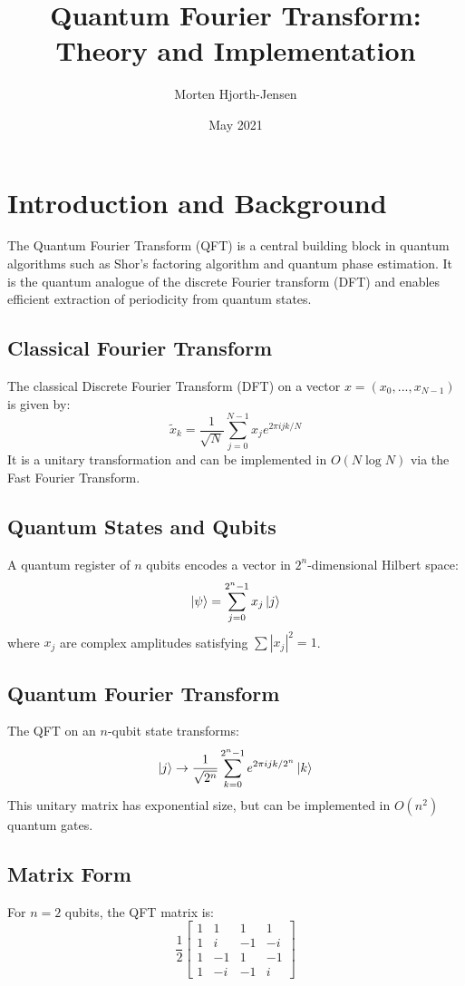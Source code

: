 \documentclass[12pt]{book}
\title{Quantum Fourier Transform: Theory and Implementation}
\author{Morten Hjorth-Jensen}
\date{May 2021}
\begin{document}
\maketitle
\tableofcontents

\chapter{Introduction and Background}
The Quantum Fourier Transform (QFT) is a central building block in quantum algorithms such as Shor's factoring algorithm and quantum phase estimation. It is the quantum analogue of the discrete Fourier transform (DFT) and enables efficient extraction of periodicity from quantum states.

\section{Classical Fourier Transform}
The classical Discrete Fourier Transform (DFT) on a vector $x = (x_0, ..., x_{N-1})$ is given by:
\[
\tilde{x}_k = \frac{1}{\sqrt{N}} \sum_{j=0}^{N-1} x_j e^{2\pi i jk / N}
\]
It is a unitary transformation and can be implemented in $O(N \log N)$ via the Fast Fourier Transform.

\section{Quantum States and Qubits}
A quantum register of $n$ qubits encodes a vector in $2^n$-dimensional Hilbert space:
\[
\ket{\psi} = \sum_{j=0}^{2^n - 1} x_j \ket{j}
\]
where $x_j$ are complex amplitudes satisfying $\sum |x_j|^2 = 1$.

\section{Quantum Fourier Transform}
The QFT on an $n$-qubit state transforms:
\[
\ket{j} \rightarrow \frac{1}{\sqrt{2^n}} \sum_{k=0}^{2^n - 1} e^{2\pi i jk / 2^n} \ket{k}
\]
This unitary matrix has exponential size, but can be implemented in $O(n^2)$ quantum gates.

\section{Matrix Form}
For $n = 2$ qubits, the QFT matrix is:
\[
\frac{1}{2}
\begin{bmatrix}
1 & 1 & 1 & 1 \\
1 & i & -1 & -i \\
1 & -1 & 1 & -1 \\
1 & -i & -1 & i
\end{bmatrix}
\]
\end{document}
